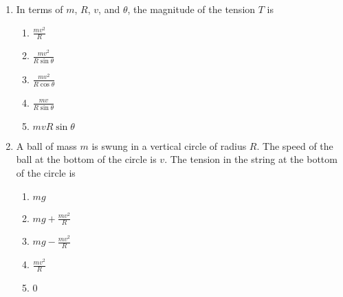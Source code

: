 \documentclass{../../../oss-apphys}
\begin{document}
\begin{multicols*}{2}
\begin{enumerate}[leftmargin=18pt,resume]
\begin{enumerate}[nosep,leftmargin=18pt,label=(\Alph*)]
    \item{}
      
    \item{}
    \end{enumerate}
    \label{ball1}

  \item In terms of $m$, $R$, $v$, and $\theta$, the magnitude of the tension
    $T$ is
    \begin{enumerate}[nosep,leftmargin=18pt,label=(\Alph*)]
    \item $\displaystyle\frac{mv^2}R$
    \item $\displaystyle\frac{mv^2}{R\sin\theta}$
    \item $\displaystyle\frac{mv^2}{R\cos\theta}$
    \item $\displaystyle\frac{mv}{R\sin\theta}$
    \item $mvR\sin\theta$
    \end{enumerate}
    \label{ball2}
    
  \item A ball of mass $m$ is swung in a vertical circle of radius $R$. The
    speed of the ball at the bottom of the circle is $v$. The tension in the
    string at the bottom of the circle is
    \begin{enumerate}[nosep,leftmargin=18pt,label=(\Alph*)]
    \item $mg$
    \item $\displaystyle mg+\frac{mv^2}{R}$
    \item $\displaystyle mg-\frac{mv^2}{R}$
    \item $\displaystyle \frac{mv^2}{R}$
    \item 0
    \end{enumerate}
    \columnbreak
    

\end{enumerate}
\end{multicols*}
\end{document}

